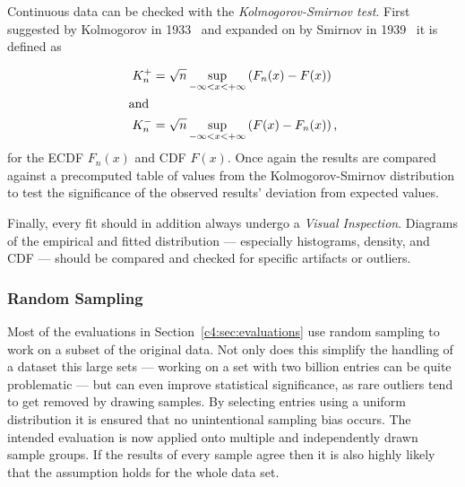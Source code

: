 Continuous data can be checked with the \textit{Kolmogorov-Smirnov test}. First suggested by Kolmogorov in 1933~\cite{kolmogorov1933sulla} and expanded on by Smirnov in 1939~\cite{smirnov1939estimation} it is defined as

\begin{align}
	K_n^+ &= \sqrt{n} \sup_{-\infty < x < + \infty} \left( F_n(x) - F(x) \right) \\
	\shortintertext{and}
	\phantom{,}K_n^- &= \sqrt{n} \sup_{-\infty < x < + \infty} \left( F(x) - F_n(x) \right)\text{,}
\end{align}
%
for the \gls{ECDF} $F_n(x)$ and \gls{CDF} $F(x)$. Once again the results are compared against a precomputed table of values from the Kolmogorov-Smirnov distribution to test the significance of the observed results' deviation from expected values. 

Finally, every fit should in addition always undergo a \textit{Visual Inspection}. 
Diagrams of the empirical and fitted distribution --- especially histograms, density, and \gls{CDF} --- should be compared and checked for specific artifacts or outliers. 



\subsubsection{Random Sampling}

Most of the evaluations in Section~\ref{c4:sec:evaluations} use random sampling to work on a subset of the original data.  Not only does this simplify the handling of a dataset this large sets --- working on a set with two billion entries can be quite problematic --- but can even improve statistical significance, as rare outliers tend to get removed by drawing samples. 
By selecting entries using a uniform distribution it is ensured that no unintentional sampling bias 
occurs. The intended evaluation is now applied onto multiple and independently drawn sample groups. If the results of every sample agree then it is also highly likely that the assumption holds for the whole data set.






